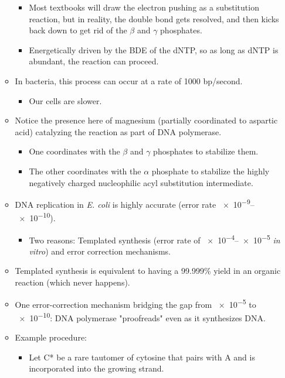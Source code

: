 \documentclass[../notes.tex]{subfiles}
\begin{document}
\begin{itemize}
\begin{itemize}
        \begin{itemize}
            \item Most textbooks will draw the electron pushing as a substitution reaction, but in reality, the double bond gets resolved, and then kicks back down to get rid of the $\beta$ and $\gamma$ phosphates.
            \item Energetically driven by the BDE of the dNTP, so as long as dNTP is abundant, the reaction can proceed.
        \end{itemize}
        \item In bacteria, this process can occur at a rate of 1000 bp/second.
        \begin{itemize}
            \item Our cells are slower.
        \end{itemize}
        \item Notice the presence here of magnesium (partially coordinated to aspartic acid) catalyzing the reaction as part of DNA polymerase.
        \begin{itemize}
            \item One  coordinates with the $\beta$ and $\gamma$ phosphates to stabilize them.
            \item The other coordinates with the $\alpha$ phosphate to stabilize the highly negatively charged nucleophilic acyl substitution intermediate.
        \end{itemize}
        \item DNA replication in \emph{E. coli} is highly accurate (error rate \numrange{e-9}{e-10}).
        \begin{itemize}
            \item Two reasons: Templated synthesis (error rate of \numrange{e-4}{e-5} \emph{in vitro}) and error correction mechanisms.
        \end{itemize}
        \item Templated synthesis is equivalent to having a 99.999\% yield in an organic reaction (which never happens).
        \item One error-correction mechanism bridging the gap from \num{e-5} to \num{e-10}: DNA polymerase "proofreads" even as it synthesizes DNA.
        \item Example procedure:
        \begin{itemize}
            \item Let C* be a rare tautomer of cytosine that pairs with A and is incorporated into the growing strand.

\end{itemize}
\end{itemize}
\end{itemize}
\end{document}
